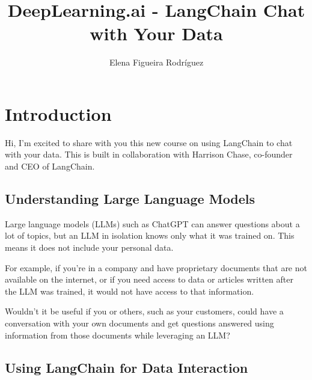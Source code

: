 \documentclass{article}
\title{DeepLearning.ai - LangChain Chat with Your Data}
\author{Elena Figueira Rodríguez}
\begin{document}
\maketitle

\begin{abstract}

\end{abstract}

\maketitle

\tableofcontents

\newpage  %

\section{Introduction}

Hi, I'm excited to share with you this new course on using LangChain to chat with your data. This is built in collaboration with Harrison Chase, co-founder and CEO of LangChain.

\subsection{Understanding Large Language Models}

Large language models (LLMs) such as ChatGPT can answer questions about a lot of topics, but an LLM in isolation knows only what it was trained on. This means it does not include your personal data. 

For example, if you're in a company and have proprietary documents that are not available on the internet, or if you need access to data or articles written after the LLM was trained, it would not have access to that information.

Wouldn't it be useful if you or others, such as your customers, could have a conversation with your own documents and get questions answered using information from those documents while leveraging an LLM?

\subsection{Using LangChain for Data Interaction}
\end{document}
